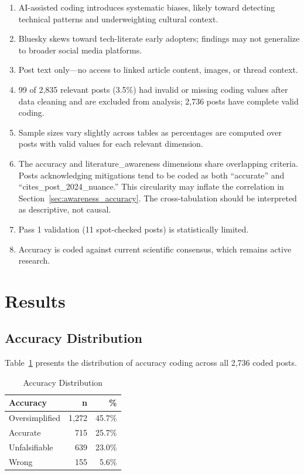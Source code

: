 \documentclass[11pt,preprint]{article}
\begin{document}
\begin{enumerate}
  \item AI-assisted coding introduces systematic biases, likely toward detecting technical patterns and underweighting cultural context.
  \item Bluesky skews toward tech-literate early adopters; findings may not generalize to broader social media platforms.
  \item Post text only---no access to linked article content, images, or thread context.
  \item 99 of 2,835 relevant posts (3.5\%) had invalid or missing coding values after data cleaning and are excluded from analysis; 2,736 posts have complete valid coding.
  \item Sample sizes vary slightly across tables as percentages are computed over posts with valid values for each relevant dimension.
  \item The accuracy and literature\_awareness dimensions share overlapping criteria. Posts acknowledging mitigations tend to be coded as both ``accurate'' and ``cites\_post\_2024\_nuance.'' This circularity may inflate the correlation in Section~\ref{sec:awareness_accuracy}. The cross-tabulation should be interpreted as descriptive, not causal.
  \item Pass 1 validation (11 spot-checked posts) is statistically limited.
  \item Accuracy is coded against current scientific consensus, which remains active research.
\end{enumerate}

\section{Results}
\label{sec:results}

\subsection{Accuracy Distribution}

Table~\ref{tab:accuracy_dist} presents the distribution of accuracy coding across all 2,736 coded posts.

\begin{table}[h]
\centering
\caption{Accuracy Distribution}
\label{tab:accuracy_dist}
\begin{tabular}{lrr}
\toprule
\textbf{Accuracy} & \textbf{n} & \textbf{\%} \\
\midrule
Oversimplified & 1,272 & 45.7\% \\
Accurate & 715 & 25.7\% \\
Unfalsifiable & 639 & 23.0\% \\
Wrong & 155 & 5.6\% \\
\bottomrule
\end{tabular}
\end{table}
\end{document}
